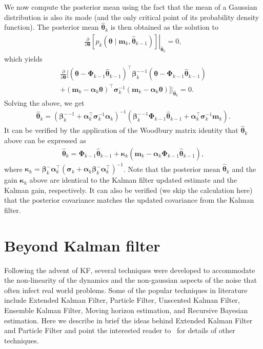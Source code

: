 \documentclass{resonance}
\def\th{\bm{\theta}}
\def\thh{\bm{\hat{\theta}}}
\def\m{\bm{m}}
\def\p{\bm{\beta}}
\def\K{\bm{\kappa}}
\def\S{\bm{\sigma}}
\def\H{\bm{\alpha}}
\def\PhiB{\boldsymbol{\Phi}}
\begin{document}
We now compute the posterior mean using the fact that 
the mean of a Gaussian distribution is also its mode (and the only
critical point of its
probability density function). The posterior mean $\thh_{k}$
is then obtained as the solution to
\begin{align*}
    \frac{\partial}{\partial \th} \left. \left[ p_k \left( \th  \; | \; \m_k, \thh_{k-1} \right) \right] \right|_{\thh_{k}} = 0,
\end{align*}
which yields
\begin{align*}
    \frac{\partial}{\partial \th} \bigg[ ( \th - \PhiB_{k-1} \thh_{k-1} )^\top {\p_k^{-}}^{-1}  ( \th - \PhiB_{k-1} \thh_{k-1} ) \\
    + ( \m_k - \H_k \th )^\top \S_k^{-1}  ( \m_k - \H_k \th ) \bigg] \bigg|_{\thh_{k}} = 0.
\end{align*}
Solving the above, we get
\begin{align*}
    \thh_{k} = \left( {\p_k^{-}}^{-1} + \H_k^\top \S_k^{-1} \H_k \right)^{-1} \left( {\p_k^{-}}^{-1} \PhiB_{k-1} \thh_{k-1} + \H_k^\top \S_k^{-1} \m_k \right).
\end{align*}
It can be verified by the application of the Woodbury matrix identity 
that $\thh_{k}$ above can be expressed as
\begin{align*}
    \thh_{k} = \PhiB_{k-1} \thh_{k-1} + \K_k \left( \m_k - \H_k \PhiB_{k-1} \thh_{k-1} \right),
\end{align*}
where $\K_k = {\p_k^{-}} \H_k^\top \left( \S_k + \H_k {\p_k^{-}} \H_k^\top \right)^{-1}$. Note that the posterior mean $\thh_{k}$ and the gain $\K_k$ above are identical to the Kalman filter
updated estimate and the Kalman gain, respectively.
It can also be verified (we skip the calculation here) 
that the posterior covariance matches the
updated covariance from the Kalman filter.

\section{Beyond Kalman filter}
Following the advent of KF, several techniques were developed to accommodate the non-linearity of the dynamics and the non-gaussian aspects of the noise that often infect real world problems. Some of the popular techniques in literature include Extended Kalman Filter, Particle Filter, Unscented Kalman Filter, Ensemble Kalman Filter, Moving horizon estimation, and Recursive Bayesian estimation. Here we describe in brief the ideas behind Extended Kalman Filter and Particle Filter and point the interested reader to~\cite{simon2006optimal} for details of other techniques.
\end{document}
